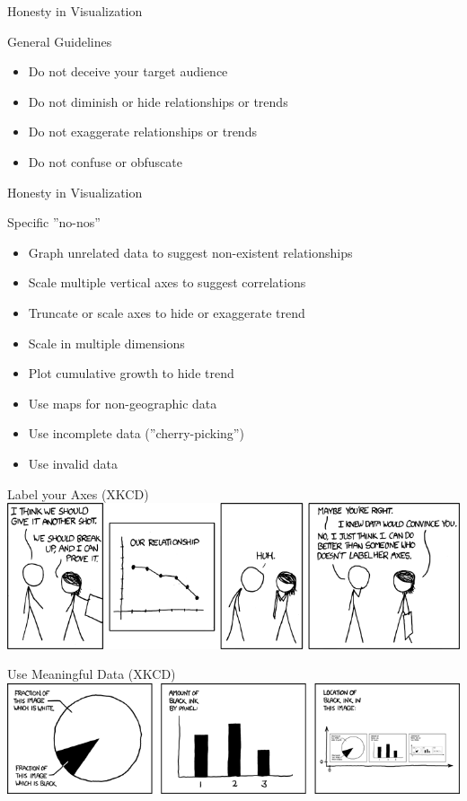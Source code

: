 \documentclass[ignorenonframetext,xcolor=x11names]{beamer}
\begin{document}
\begin{frame}{Honesty in Visualization}
\begin{block}{General Guidelines}
	\begin{itemize}
		\item Do not deceive your target audience
		\item Do not diminish or hide relationships or trends
		\item Do not exaggerate relationships or trends
		\item Do not confuse or obfuscate
	\end{itemize}
\end{block}
\end{frame}

\begin{frame}{Honesty in Visualization}
\begin{block}{Specific ''no-nos''}
	\begin{itemize}
		\item Graph unrelated data to suggest non-existent relationships
		\item Scale multiple vertical axes to suggest correlations
		\item Truncate or scale axes to hide or exaggerate trend
		\item Scale in multiple dimensions
		\item Plot cumulative growth to hide trend
		\item Use maps for non-geographic data
		\item Use incomplete data (''cherry-picking'')
		\item Use invalid data
	\end{itemize}	
\end{block}
\end{frame}

\begin{frame}{Label your Axes (XKCD)}
  \includegraphics[width=\textwidth]{xkcd_convincing.png}
\end{frame}

\begin{frame}{Use Meaningful Data (XKCD)}
  \includegraphics[width=\textwidth]{xkcd_self_description.png}
\end{frame}
\end{document}
